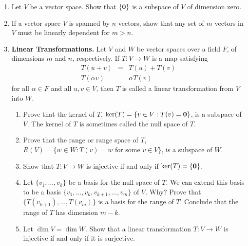 {\begin{enumerate}
\bf\item\rm
Let $V$ be a vector space. Show that $\{ {\bold 0} \}$ is a subspace
of $V$ of dimension zero.


\bf\item\rm
If a vector space $V$ is spanned by $n$ vectors, show that any set of
$m$ vectors in $V$ must be linearly dependent for $m >n$.  


\bf\item\rm
{\bf Linear Transformations.}
Let $V$ and $W$ be vector spaces over a field $F$, of dimensions $m$
and $n$, respectively. If $T: V \rightarrow W$ is a map satisfying
\begin{eqnarray*}
T( u+ v ) & = & T(u ) + T(v) \\
T( \alpha v ) & = & \alpha T(v)
\end{eqnarray*}
for all $\alpha \in F$ and all $u, v \in V$, then $T$ is called a
{\bfi linear transformation\/} from $V$ into $W$. 
\begin{enumerate}

   \bf\item\rm
Prove that the {\bfi kernel\/} of $T$, 
$\ker(T) = \{ v \in V : T(v) = 
{\bold 0} \}$, is a subspace of $V$. The kernel of $T$ is sometimes
called the {\bfi null space\/} of $T$. 

   \bf\item\rm
Prove that the {\bfi range\/} or
{\bfi range space\/} of $T$, $R(V) = \{ w \in W : T(v) = w \mbox{ for
some $v \in V$} \}$, is a subspace of $W$. 

   \bf\item\rm
Show that $T : V \rightarrow W$ is injective if and only if 
$\ker(T) = \{ \bold 0 \}$.

   \bf\item\rm
Let $\{ v_1, \ldots, v_k \}$ be a basis for the null space of $T$. We
can extend this basis to be a basis $\{ v_1, \ldots, v_k, v_{k+1},
\ldots, v_m\}$ of $V$. Why?  Prove that $\{ T(v_{k+1}), \ldots, T(v_m)
\}$ is a basis for the range of $T$. Conclude that the range of $T$
has dimension $m-k$.

   \bf\item\rm
Let $\dim V = \dim W$.  Show that a linear transformation $T : V
\rightarrow W$ is injective if and only if it is surjective.


\end{enumerate}
\end{enumerate}}
